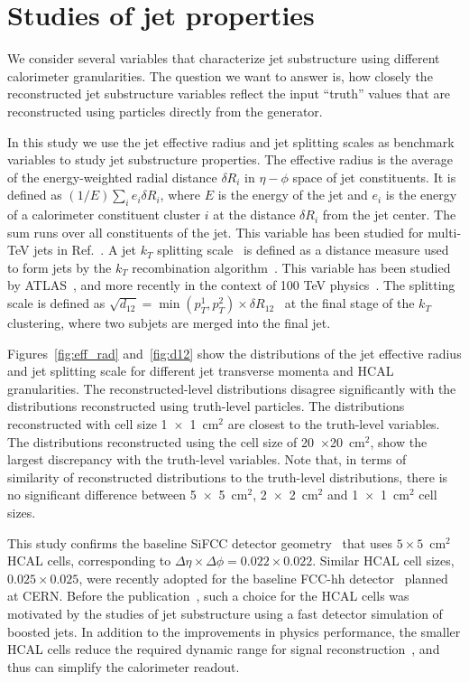 \section{Studies of jet properties}
\label{sec:jets}

We consider several variables that characterize jet substructure using different calorimeter granularities. The question we want to answer is, how closely the reconstructed
jet substructure variables reflect the input ``truth'' values  that are reconstructed using particles directly from the \pythia generator.

In this study we use the jet effective radius and jet splitting scales as benchmark variables
to study jet substructure properties. 
The effective radius is the average of the energy-weighted radial distance $\delta R_i$ in $\eta-\phi$ space of jet constituents.
It is defined as $(1/E) \sum_i e_i \delta R_i$, where $E$ is the energy of the jet and $e_i$ is the energy of a calorimeter 
constituent cluster $i$ at the distance $\delta R_i$ from the jet center. The sum runs over all constituents of the jet. 
This variable has been studied for multi-TeV jets in Ref.~\cite{Auerbach:2014xua}.
A jet $k_T$ splitting scale~\cite{Butterworth:2002tt} is defined as a distance measure
used to form jets by the $k_T$ recombination
algorithm~\cite{Catani1993187,Ellis:1993tq}.
This variable has been studied by ATLAS~\cite{ATLAS:2012am}, and more recently in the context of 100 TeV physics~\cite{Auerbach:2014xua}.
The splitting scale is defined as $\sqrt{d_{12}}=\min(p_T^1,p_T^2) \times \delta R_{12}$~\cite{ATLAS:2012am} 
 at the final stage of the $k_T$ clustering, where two subjets are merged into the final jet.

Figures~\ref{fig:eff_rad} and~\ref{fig:d12} show the distributions of 
the jet effective radius and jet splitting scale for  different jet transverse momenta and HCAL granularities. 
The reconstructed-level distributions  disagree significantly with the distributions  
reconstructed using truth-level particles. The distributions reconstructed with cell
size 1~$\times$~1~cm$^2$ are closest to the truth-level variables. The distributions 
reconstructed using the cell size of 20~$\times$20~cm$^2$, show the largest discrepancy with the
truth-level variables. Note that, in terms of similarity of reconstructed distributions to the truth-level distributions, 
there is no significant difference between 5~$\times$~5~cm$^2$,  2~$\times$~2~cm$^2$ and  1~$\times$~1~cm$^2$ cell sizes. 

This study confirms the  baseline SiFCC detector geometry~\cite{Chekanov:2016ppq} that uses $5 \times 5$~cm$^2$ HCAL cells,
corresponding to $\Delta \eta \times \Delta \phi = 0.022\times0.022$.
Similar HCAL cell sizes,  $0.025\times0.025$,  were recently adopted for the baseline FCC-hh detector~\cite{fcc1,fcc2} planned at CERN.
Before the publication~\cite{Chekanov:2016ppq},   such a choice for the HCAL cells   
was motivated by the studies of jet substructure  using a fast detector simulation of boosted jets.
In addition to the improvements in physics performance, the smaller HCAL cells 
reduce the required dynamic range for 
signal reconstruction~\cite{Chekanov:2015ihl}, and thus can simplify the calorimeter readout.

